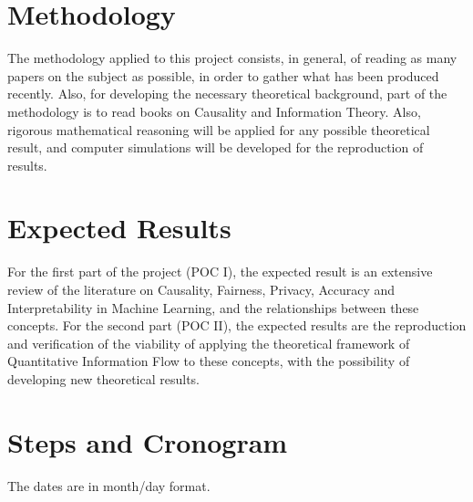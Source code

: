 \documentclass{article}
\begin{document}
\section{Methodology}

The methodology applied to this project consists, in general, of reading as many papers on the subject as possible, in order to gather what has been produced recently. Also, for developing the necessary theoretical background, part of the methodology is to read books on Causality\cite{Causality}\cite{CausalInf} and Information Theory\cite{InfoTheory}. Also, rigorous mathematical reasoning will be applied for any possible theoretical result, and computer simulations will be developed for the reproduction of results.

\section{Expected Results}

For the first part of the project (POC I), the expected result is an extensive review of the literature on Causality, Fairness, Privacy, Accuracy and Interpretability in Machine Learning, and the relationships between these concepts. For the second part (POC II), the expected results are the reproduction and verification of the viability of applying the theoretical framework of Quantitative Information Flow to these concepts, with the possibility of developing new theoretical results. 

\section{Steps and Cronogram}

The dates are in month/day format.
\end{document}
